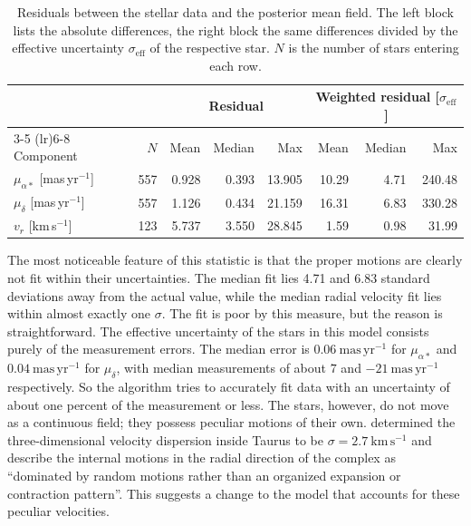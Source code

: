 \begin{table}[h!]
    \centering
    \caption{Residuals between the stellar data and the posterior mean field. The
        left block lists the absolute differences, the right block the same
        differences divided by the effective uncertainty $\sigma_\mathrm{eff}$ of
        the respective star. $N$ is the number of stars entering each row.}
    \label{tab:residuals}
    \begin{tabular}{l r r r r r r r}
        \toprule
                                         &     & \multicolumn{3}{c}{Residual} & \multicolumn{3}{c}{Weighted residual [$\sigma_\mathrm{eff}$]}                                    \\
        \cmidrule(lr){3-5} \cmidrule(lr){6-8}
        Component                        & $N$ & Mean                         & Median                                                        & Max    & Mean  & Median & Max    \\
        \midrule
        $\mu_{\alpha*}$ [mas\,yr$^{-1}$] & 557 & 0.928                        & 0.393                                                         & 13.905 & 10.29 & 4.71   & 240.48 \\
        $\mu_{\delta}$ [mas\,yr$^{-1}$]  & 557 & 1.126                        & 0.434                                                         & 21.159 & 16.31 & 6.83   & 330.28 \\
        $v_r$ [km\,s$^{-1}$]             & 123 & 5.737                        & 3.550                                                         & 28.845 & 1.59  & 0.98   & 31.99  \\
        \bottomrule
    \end{tabular}
\end{table}

The most noticeable feature of this statistic is that the proper motions are clearly not fit
within their uncertainties.
The median fit lies 4.71 and 6.83 standard deviations away from the actual value, while the median
radial velocity fit lies within almost exactly one $\sigma$.
The fit is poor by this measure, but the reason is straightforward.
The effective uncertainty of the stars in this model consists purely of the measurement errors.
The median error is $0.06~\mathrm{mas\,yr^{-1}}$ for $\mu_{\alpha*}$ and
$0.04~\mathrm{mas\,yr^{-1}}$ for $\mu_{\delta}$, with median measurements of about $7$ and $-21~\mathrm{mas\,yr^{-1}}$ respectively.
So the algorithm tries to accurately fit data with an uncertainty of about one percent of the
measurement or less.
The stars, however, do not move as a continuous field; they possess peculiar motions of their own.
\citet{Galli2019} determined the three-dimensional velocity dispersion inside Taurus to be
$\sigma = 2.7~\mathrm{km\,s^{-1}}$ and describe the internal motions in the radial direction of the
complex as ``dominated by random motions rather than an organized expansion or contraction
pattern''. This suggests a change to the model that accounts for these peculiar velocities.


